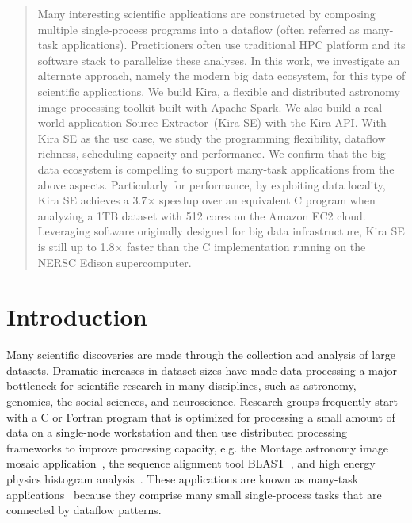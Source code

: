 \documentclass[10pt, conference, compsocconf]{IEEEtran}
\begin{document}
\maketitle

\begin{abstract}
Many interesting scientific applications are constructed by composing multiple single-process programs into a dataflow (often referred as many-task applications).
Practitioners often use traditional HPC platform and its software stack to parallelize these analyses.
In this work, we investigate an alternate approach, namely the modern big data ecosystem, for this type of scientific applications.
We build Kira, a flexible and distributed astronomy image processing toolkit built with Apache Spark. 
We also build a real world application Source Extractor~(Kira SE) with the Kira API.
With Kira SE as the use case, we study the programming flexibility, dataflow richness, scheduling capacity and performance.
We confirm that the big data ecosystem is compelling to support many-task applications from the above aspects.
Particularly for performance, by exploiting data locality, Kira SE achieves a 3.7$\times$ speedup over an equivalent C program when analyzing a 1TB
dataset with 512 cores on the Amazon EC2 cloud. 
Leveraging software originally designed for big data infrastructure, Kira SE is still up to 1.8$\times$ faster than the C implementation
running on the NERSC Edison supercomputer.


\end{abstract}



\section{Introduction}
Many scientific discoveries are made through the collection and analysis of large datasets.
Dramatic increases in dataset sizes have made data processing a major bottleneck for scientific research in many disciplines, such as astronomy, genomics, the social sciences, and neuroscience.
Research groups frequently start with a C or Fortran program that is optimized for processing a small amount of data on a single-node workstation and then use distributed processing frameworks to improve processing capacity, e.g. the Montage astronomy image mosaic application~\cite{jacob09},  the sequence alignment tool BLAST~\cite{altschul90}, and high energy physics histogram analysis~\cite{ekanayake08}.
These applications are known as many-task applications~\cite{raicu08} because they comprise many small single-process tasks that are connected by dataflow patterns.
\end{document}
